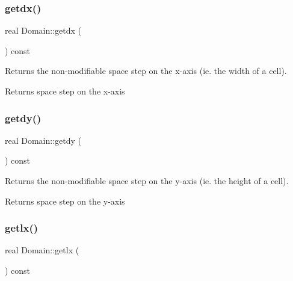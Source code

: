 \subsubsection{\texorpdfstring{getdx()}{getdx()}}
{\footnotesize\ttfamily real Domain\+::getdx (\begin{DoxyParamCaption}{ }\end{DoxyParamCaption}) const\hspace{0.3cm}{\ttfamily [inline]}}



Returns the non-\/modifiable space step on the x-\/axis (ie. the width of a cell). 

\begin{DoxyReturn}{Returns}
space step on the x-\/axis 
\end{DoxyReturn}
\mbox{\label{classDomain_a5e62ab8a8b53f67cc3c30b6066b10aac}} 
\subsubsection{\texorpdfstring{getdy()}{getdy()}}
{\footnotesize\ttfamily real Domain\+::getdy (\begin{DoxyParamCaption}{ }\end{DoxyParamCaption}) const\hspace{0.3cm}{\ttfamily [inline]}}



Returns the non-\/modifiable space step on the y-\/axis (ie. the height of a cell). 

\begin{DoxyReturn}{Returns}
space step on the y-\/axis 
\end{DoxyReturn}
\mbox{\label{classDomain_a510afad91fe81eb2ccef203a980f4223}} 
\subsubsection{\texorpdfstring{getlx()}{getlx()}}
{\footnotesize\ttfamily real Domain\+::getlx (\begin{DoxyParamCaption}{ }\end{DoxyParamCaption}) const\hspace{0.3cm}{\ttfamily [inline]}}



